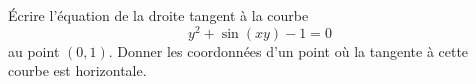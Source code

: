 
\begin{exercice}\label{exoImplicite0006}

Écrire l'équation de la droite tangent à la courbe \[y^2+\sin(xy)-1=0\] au point $(0,1)$. Donner les coordonnées d'un point où la tangente à cette courbe est horizontale.

\end{exercice}
